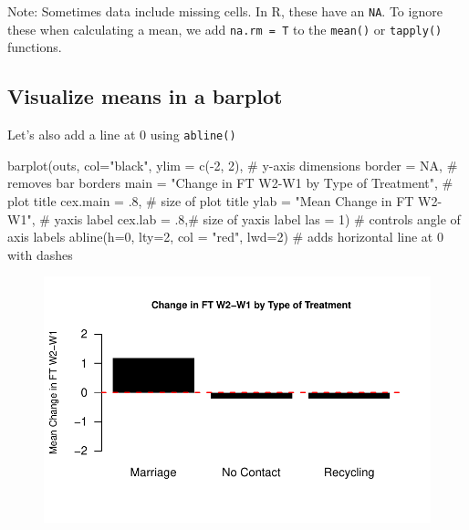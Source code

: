 \documentclass[
  letterpaper,
  DIV=11,
  numbers=noendperiod]{scrreprt}
\newenvironment{Shaded}{\begin{snugshade}}{\end{snugshade}}
\newcommand{\AttributeTok}[1]{\textcolor[rgb]{0.40,0.45,0.13}{#1}}
\newcommand{\CommentTok}[1]{\textcolor[rgb]{0.37,0.37,0.37}{#1}}
\newcommand{\ConstantTok}[1]{\textcolor[rgb]{0.56,0.35,0.01}{#1}}
\newcommand{\DecValTok}[1]{\textcolor[rgb]{0.68,0.00,0.00}{#1}}
\newcommand{\FunctionTok}[1]{\textcolor[rgb]{0.28,0.35,0.67}{#1}}
\newcommand{\NormalTok}[1]{\textcolor[rgb]{0.00,0.23,0.31}{#1}}
\newcommand{\SpecialCharTok}[1]{\textcolor[rgb]{0.37,0.37,0.37}{#1}}
\newcommand{\StringTok}[1]{\textcolor[rgb]{0.13,0.47,0.30}{#1}}
\begin{document}
Note: Sometimes data include missing cells. In R, these have an
\texttt{NA}. To ignore these when calculating a mean, we add
\texttt{na.rm\ =\ T} to the \texttt{mean()} or \texttt{tapply()}
functions.

\hypertarget{visualize-means-in-a-barplot}{%
\subsection{Visualize means in a
barplot}\label{visualize-means-in-a-barplot}}

Let's also add a line at 0 using \texttt{abline()}

\begin{Shaded}
\begin{Highlighting}[]
\FunctionTok{barplot}\NormalTok{(outs,}
        \AttributeTok{col=}\StringTok{"black"}\NormalTok{,}
        \AttributeTok{ylim =}  \FunctionTok{c}\NormalTok{(}\SpecialCharTok{{-}}\DecValTok{2}\NormalTok{, }\DecValTok{2}\NormalTok{), }\CommentTok{\# y{-}axis dimensions}
        \AttributeTok{border =} \ConstantTok{NA}\NormalTok{, }\CommentTok{\# removes bar borders}
        \AttributeTok{main =} \StringTok{"Change in FT W2{-}W1 by Type of Treatment"}\NormalTok{, }\CommentTok{\# plot title}
        \AttributeTok{cex.main =}\NormalTok{ .}\DecValTok{8}\NormalTok{, }\CommentTok{\# size of plot title}
        \AttributeTok{ylab =} \StringTok{"Mean Change in FT W2{-}W1"}\NormalTok{, }\CommentTok{\# yaxis label}
        \AttributeTok{cex.lab =}\NormalTok{ .}\DecValTok{8}\NormalTok{,}\CommentTok{\# size of yaxis label}
        \AttributeTok{las =} \DecValTok{1}\NormalTok{) }\CommentTok{\# controls angle of axis labels}
\FunctionTok{abline}\NormalTok{(}\AttributeTok{h=}\DecValTok{0}\NormalTok{, }\AttributeTok{lty=}\DecValTok{2}\NormalTok{, }\AttributeTok{col =} \StringTok{"red"}\NormalTok{, }\AttributeTok{lwd=}\DecValTok{2}\NormalTok{) }\CommentTok{\# adds horizontal line at 0 with dashes }
\end{Highlighting}
\end{Shaded}

\begin{figure}[H]

{\centering \includegraphics{04-Visualization_files/figure-pdf/unnamed-chunk-22-1.pdf}

}

\end{figure}
\end{document}
